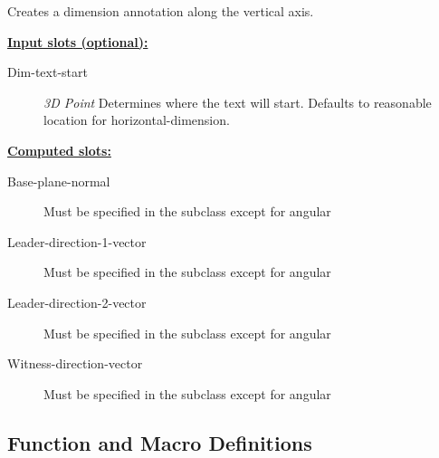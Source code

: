 \documentclass [11pt]{book}
\begin{document}
\begin{itemize}
\begin{description}
Creates a dimension annotation along the vertical axis.



\end{description}








\textbf{
\underline{Input slots (optional):}}

\begin{description}

\item [Dim-text-start]
\emph{3D Point} Determines where the text will start. Defaults to reasonable location for
horizontal-dimension.


\end{description}






\textbf{
\underline{Computed slots:}}

\begin{description}

\item [Base-plane-normal]
Must be specified in the subclass except for angular


\item [Leader-direction-1-vector]
Must be specified in the subclass except for angular


\item [Leader-direction-2-vector]
Must be specified in the subclass except for angular


\item [Witness-direction-vector]
Must be specified in the subclass except for angular


\end{description}







\end{itemize}



\subsection{Function and Macro Definitions}
\end{document}
